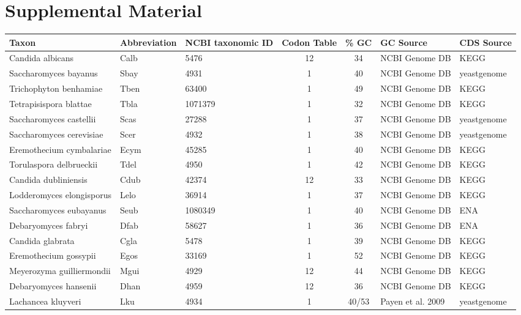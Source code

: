 \documentclass[12pt]{article}
\begin{document}
\section*{Supplemental Material}
\begin{table}
\begin{tabular}{ | l | l | l | c | c | l | l | }
\hline
	Taxon 				& Abbreviation 	& NCBI taxonomic ID 	& Codon Table	& \% GC & GC Source  		& CDS Source \\ \hline
	Candida albicans 		& Calb 		& 5476 			&	12	& 34 	& NCBI Genome DB 	& KEGG \\ \hline
	Saccharomyces bayanus 		& Sbay 		& 4931 			&	1	& 40 	& NCBI Genome DB 	& yeastgenome \\ \hline
	Trichophyton benhamiae 		& Tben		& 63400 		&	1	& 49 	& NCBI Genome DB 	& KEGG \\ \hline
	Tetrapisispora blattae 		& Tbla 		& 1071379 		&	1	& 32 	& NCBI Genome DB 	& KEGG \\ \hline
	Saccharomyces castellii 	& Scas 		& 27288 		&	1	& 37 	& NCBI Genome DB 	& yeastgenome \\ \hline
	Saccharomyces cerevisiae 	& Scer 		& 4932 			&	1	& 38 	& NCBI Genome DB 	& yeastgenome \\ \hline
	Eremothecium cymbalariae 	& Ecym 		& 45285 		&	1	& 40 	& NCBI Genome DB 	& KEGG \\ \hline
	Torulaspora delbrueckii 	& Tdel 		& 4950 			&	1	& 42 	& NCBI Genome DB 	& KEGG \\ \hline
	Candida dubliniensis 		& Cdub 		& 42374 		&	12	& 33 	& NCBI Genome DB 	& KEGG \\ \hline
	Lodderomyces elongisporus 	& Lelo 		& 36914 		&	1	& 37 	& NCBI Genome DB 	& KEGG \\ \hline
	Saccharomyces eubayanus 	& Seub 		& 1080349 		&	1	& 40 	& NCBI Genome DB 	& ENA \\ \hline
	Debaryomyces fabryi 		& Dfab 		& 58627 		&	1	& 36 	& NCBI Genome DB 	& ENA \\ \hline
	Candida glabrata 		& Cgla 		& 5478 			&	1	& 39 	& NCBI Genome DB 	& KEGG \\ \hline
	Eremothecium gossypii 		& Egos 		& 33169 		&	1	& 52 	& NCBI Genome DB 	& KEGG \\ \hline
	Meyerozyma guilliermondii 	& Mgui 		& 4929 			&	12	& 44 	& NCBI Genome DB 	& KEGG \\ \hline
	Debaryomyces hansenii 		& Dhan 		& 4959 			&	12	& 36 	& NCBI Genome DB 	& KEGG \\ \hline
	Lachancea kluyveri 		& Lku 		& 4934 			&	1	& 40/53 & Payen et al. 2009 	& yeastgenome \\ \hline

\end{tabular}
\end{table}
\end{document}
